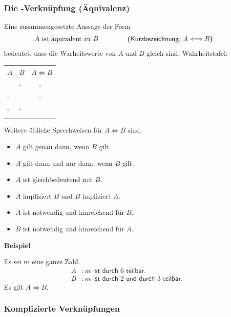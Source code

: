 \documentclass[a4paper,12pt,oneside,openany]{book}
\newenvironment{beispiel}[1][]{\vspace{2mm}\normalfont\normalsize \textbf{Beispiel}\ifthenelse{\equal{#1}{}}{:}{: #1}\newline\vspace{-8mm}\begin{addmargin}[5mm]{0cm}}{\end{addmargin}}
\newcommand{\überschrift}[1]{\subsubsection{#1}}
\begin{document}
\überschrift{Die -Verknüpfung (Äquivalenz)}

Eine zusammengesetzte Aussage der Form
\newcommand{\equivalent}{\Longleftrightarrow}
\begin{align*}
	A \textrm{~ist äquivalent zu~} B & \hspace*{1.5cm}\textsf{(Kurzbezeichnung:~} A \equivalent B \textsf{)}
\end{align*}
bedeutet, dass die Warheitswerte von \(A\) und \(B\) gleich sind. Wahrheitstafel:

\begin{table}[h]
	\centering
	\begin{tabular}{c | c | c}
		\( A \) & \( B \) & \( A \equivalent B \) \\
		\hline
		\w      & \w      & \w                    \\
		\w      & \f      & \f                    \\
		\f      & \w      & \f                    \\
		\f      & \f      & \w
	\end{tabular}
\end{table}

Weitere übliche Sprechweisen für \(A \equivalent B\) sind:
\begin{itemize}
	\item \(A\) gilt genau dann, wenn \(B\) gilt.
	\item \(A\) gilt dann und nur dann, wenn \(B\) gilt.
	\item \(A\) ist gleichbedeutend mit \(B\).
	\item \(A\) impliziert \(B\) und \(B\) impliziert \(A\).
	\item \(A\) ist notwendig und hinreichend für \(B\).
	\item \(B\) ist notwendig und hinreichend für \(A\).
\end{itemize}

\begin{beispiel}
	Es sei \(m\) eine ganze Zahl.
	\begin{align*}
		A & : m \textsf{~ist durch~} 6 \textsf{~teilbar.}                        \\
		B & : m \textsf{~ist durch~} 2 \textsf{~und durch~} 3 \textsf{~teilbar.}
	\end{align*}
	Es gilt \(A \equivalent B\).
\end{beispiel}

\überschrift{Komplizierte Verknüpfungen}
\end{document}
